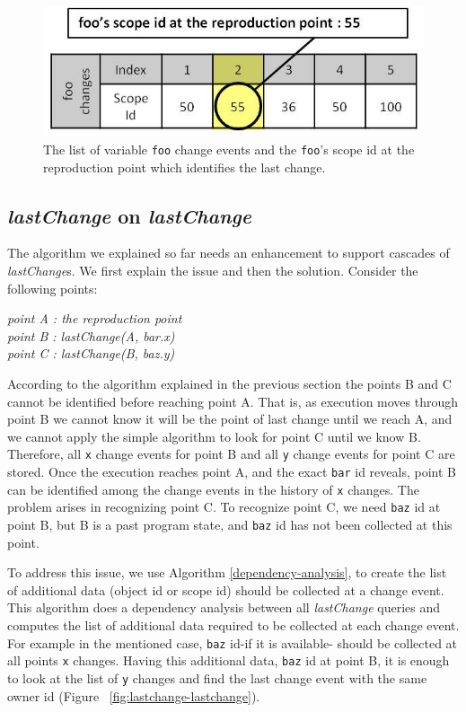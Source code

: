 \documentclass[runningheads,a4paper]{llncs}
\begin{document}
\begin{figure}[htp]
\includegraphics[width=.48\textwidth]{7-foo-changes2.jpg}
\caption{The list of variable \texttt{foo} change events and the
  \texttt{foo}'s scope id at the reproduction point which identifies
  the last change.}
\label{fig:foo-changes2}
\end{figure}

 
\subsection{\textit{lastChange} on \textit{lastChange}}
The algorithm we explained so far needs an enhancement to support
cascades of \textit{lastChange}s. We first explain the issue
and then the solution. Consider the following points:

\begin{center}
\textit{
 point A : the reproduction point \\
 point B : lastChange(A, bar.x) \\
 point C : lastChange(B, baz.y) 
 }
 \end{center}
According to the algorithm explained in the previous section
the points B and C cannot be identified before reaching point
A. That is, as execution moves through point B we cannot know it will be the point of last change until
we reach A, and we cannot apply the simple algorithm to look for point C until we know B. 
 Therefore, all \texttt{x} change events for point B and all \texttt{y}
change events for point C are stored. Once the execution reaches point A,
and the exact \texttt{bar} id reveals, point B can be identified among
the change events in the history of \texttt{x} changes. The problem
arises in recognizing point C. To recognize point C, we need
\texttt{baz} id at point B, but B is a past program state, and
\texttt{baz} id has not been collected at this point.

To address this issue, we use Algorithm \ref{dependency-analysis}, to
create the list of additional data (object id or scope id) should be collected at a change
event. This algorithm does a dependency analysis between all
\textit{lastChange} queries and computes the list of additional data
required to be collected at each change event. For example in the
mentioned case, \texttt{baz} id-if it is available- should be
collected at all points \texttt{x} changes. Having this additional
data, \texttt{baz} id at point B, it is enough to look at the list
of \texttt{y} changes and find the last change event with the same 
owner id (Figure ~\ref{fig:lastchange-lastchange}).
\end{document}
